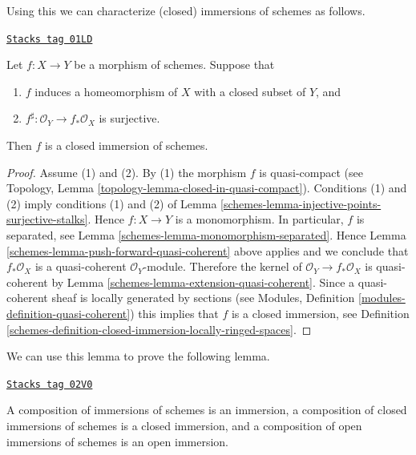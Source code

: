 Using this we can characterize (closed) immersions of schemes
as follows.

\begin{lemma}
\label{schemes-lemma-characterize-closed-immersions}
\href{https://stacks.math.columbia.edu/tag/01LD}{\texttt{Stacks tag 01LD}}

Let $f : X \to Y$ be a morphism of schemes.
Suppose that
\begin{enumerate}
\item $f$ induces a homeomorphism of $X$ with a
closed subset of $Y$, and
\item $f^\sharp : \mathcal{O}_Y \to f_*\mathcal{O}_X$
is surjective.
\end{enumerate}
Then $f$ is a closed immersion of schemes.
\end{lemma}

\begin{proof}

Assume (1) and (2). By (1) the morphism $f$ is quasi-compact
(see Topology, Lemma \ref{topology-lemma-closed-in-quasi-compact}).
Conditions (1) and (2) imply conditions (1) and (2) of
Lemma \ref{schemes-lemma-injective-points-surjective-stalks}.
Hence $f : X \to Y$ is a monomorphism. In particular, $f$
is separated, see Lemma \ref{schemes-lemma-monomorphism-separated}.
Hence Lemma \ref{schemes-lemma-push-forward-quasi-coherent}
above applies and we conclude that $f_*\mathcal{O}_X$ is a quasi-coherent
$\mathcal{O}_Y$-module. Therefore the kernel of
$\mathcal{O}_Y \to f_*\mathcal{O}_X$ is quasi-coherent
by Lemma \ref{schemes-lemma-extension-quasi-coherent}. Since a quasi-coherent
sheaf is locally generated by sections (see
Modules, Definition \ref{modules-definition-quasi-coherent})
this implies that $f$ is a closed immersion, see
Definition \ref{schemes-definition-closed-immersion-locally-ringed-spaces}.
\end{proof}

We can use this lemma to prove the following lemma.

\begin{lemma}
\label{schemes-lemma-composition-immersion}
\href{https://stacks.math.columbia.edu/tag/02V0}{\texttt{Stacks tag 02V0}}

A composition of immersions of schemes is an immersion,
a composition of closed immersions of schemes is a closed immersion, and
a composition of open immersions of schemes is an open immersion.
\end{lemma}

